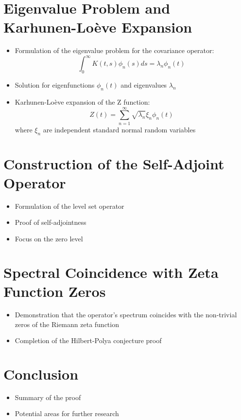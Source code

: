 \documentclass{article}
\begin{document}
\section{Eigenvalue Problem and Karhunen-Loève Expansion}
\begin{itemize}
    \item Formulation of the eigenvalue problem for the covariance operator:
    $$ \int_0^\infty K(t,s)\phi_n(s)ds = \lambda_n \phi_n(t) $$
    \item Solution for eigenfunctions $\phi_n(t)$ and eigenvalues $\lambda_n$
    \item Karhunen-Loève expansion of the Z function:
    $$ Z(t) = \sum_{n=1}^\infty \sqrt{\lambda_n} \xi_n \phi_n(t) $$
    where $\xi_n$ are independent standard normal random variables
\end{itemize}

\section{Construction of the Self-Adjoint Operator}
\begin{itemize}
    \item Formulation of the level set operator
    \item Proof of self-adjointness
    \item Focus on the zero level
\end{itemize}

\section{Spectral Coincidence with Zeta Function Zeros}
\begin{itemize}
    \item Demonstration that the operator's spectrum coincides with the non-trivial zeros of the Riemann zeta function
    \item Completion of the Hilbert-Polya conjecture proof
\end{itemize}

\section{Conclusion}
\begin{itemize}
    \item Summary of the proof
    \item Potential areas for further research
\end{itemize}
\end{document}
